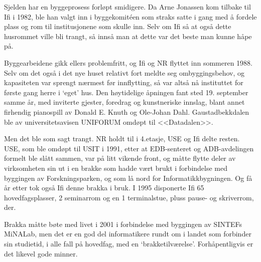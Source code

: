 Sjelden har en byggeprosess forløpt smidigere. Da Arne Jonassen kom tilbake til Ifi i 1982, ble han valgt inn i byggekomitéen som straks satte i gang med å fordele plass og rom til institusjonene som skulle inn. Selv om Ifi så at også dette husrommet ville bli trangt, så innså man at dette var det beste man kunne håpe på.

Byggearbeidene gikk ellers problemfritt, og Ifi og NR flyttet inn sommeren 1988. Selv om det også i det nye huset relativt fort meldte seg ombyggingsbehov, og kapasiteten var sprengt nærmest før innflytting, så var altså nå instituttet for første gang herre i `eget' hus. Den høytidelige åpningen fant sted 19. september samme år, med inviterte gjester, foredrag og kunstneriske innslag, blant annet firhendig pianospill av Donald E. Knuth og Ole-Johan Dahl. Gaustadbekkdalen ble av universitetsavisen UNIFORUM omdøpt til <<Datadalen>>.

Men det ble som sagt trangt. NR holdt til i 4.etasje, USE og Ifi delte resten. USE, som ble omdøpt til USIT i 1991, etter at EDB-senteret og ADB-avdelingen formelt ble slått sammen, var på litt vikende front, og måtte flytte deler av virksomheten sin ut i en brakke som hadde vært brukt i forbindelse med byggingen av Forskningsparken, og som lå nord for Informatikkbygningen. Og få år etter tok også Ifi denne brakka i bruk. I 1995 disponerte Ifi 65 hovedfagsplasser, 2 seminarrom og en 1 terminalstue, pluss pause- og skriverrom, der.

Brakka måtte bøte med livet i 2001 i forbindelse med byggingen av SINTEFs MiNALab, men det er en god del informatikere rundt om i landet som forbinder sin studietid, i alle fall på hovedfag, med en `brakketilværelse'. Forhåpentligvis er det likevel gode minner.
